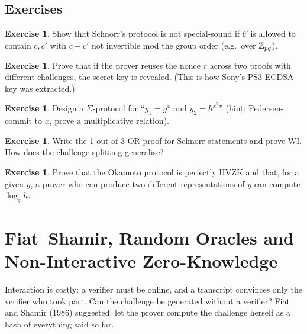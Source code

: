 \documentclass[11pt,a4paper]{report}
\theoremstyle{plain}
\theoremstyle{definition}
\newtheorem{exercise}[theorem]{Exercise}
\theoremstyle{remark}
\begin{document}
\section*{Exercises}
\begin{exercise}
Show that Schnorr's protocol is not special-sound if $\mathcal C$ is allowed to contain $c,c'$ with $c-c'$ not invertible mod the group order (e.g.\ over $\mathbb{Z}_{pq}$).
\end{exercise}
\begin{exercise}\label{ex:nonce}
Prove that if the prover reuses the nonce $r$ across two proofs with different challenges, the secret key is revealed. (This is how Sony's PS3 ECDSA key was extracted.)
\end{exercise}
\begin{exercise}
Design a $\Sigma$-protocol for ``$y_1=g^{x}$ and $y_2=h^{x^{2}}$'' (hint: Pedersen-commit to $x$, prove a multiplicative relation).
\end{exercise}
\begin{exercise}
Write the 1-out-of-3 OR proof for Schnorr statements and prove WI. How does the challenge splitting generalise?
\end{exercise}
\begin{exercise}
Prove that the Okamoto protocol is perfectly HVZK and that, for a given $y$, a prover who can produce two different representations of $y$ can compute $\log_gh$.
\end{exercise}

\chapter{Fiat--Shamir, Random Oracles and Non-Interactive Zero-Knowledge}
\label{ch:fs}
Interaction is costly: a verifier must be online, and a transcript convinces only the verifier who took part. Can the challenge be generated without a verifier? Fiat and Shamir (1986) suggested: let the prover compute the challenge herself as a hash of everything said so far.
\end{document}
